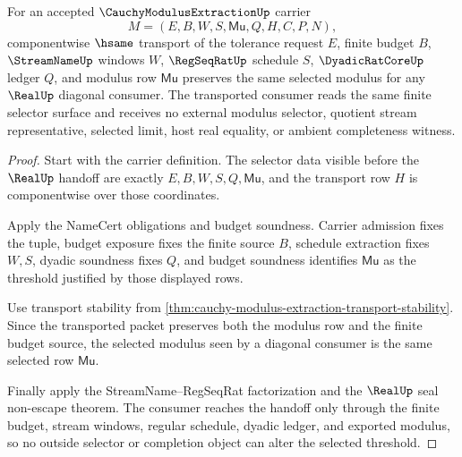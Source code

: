 \begin{theorem}
\label{thm:cauchy-modulus-extraction-selector-stability}
For an accepted $\CauchyModulusExtractionUp$ carrier
$$
M=(E,B,W,S,\mathsf{Mu},Q,H,C,P,N),
$$
componentwise $\hsame$ transport of the tolerance request $E$, finite budget $B$, $\StreamNameUp$ windows $W$, $\RegSeqRatUp$ schedule $S$, $\DyadicRatCoreUp$ ledger $Q$, and modulus row $\mathsf{Mu}$ preserves the same selected modulus for any $\RealUp$ diagonal consumer. The transported consumer reads the same finite selector surface and receives no external modulus selector, quotient stream representative, selected limit, host real equality, or ambient completeness witness.
\end{theorem}
\begin{proof}
Start with the carrier definition. The selector data visible before the $\RealUp$ handoff are exactly $E,B,W,S,Q,\mathsf{Mu}$, and the transport row $H$ is componentwise over those coordinates.

Apply the NameCert obligations and budget soundness. Carrier admission fixes the tuple, budget exposure fixes the finite source $B$, schedule extraction fixes $W,S$, dyadic soundness fixes $Q$, and budget soundness identifies $\mathsf{Mu}$ as the threshold justified by those displayed rows.

Use transport stability from \autoref{thm:cauchy-modulus-extraction-transport-stability}. Since the transported packet preserves both the modulus row and the finite budget source, the selected modulus seen by a diagonal consumer is the same selected row $\mathsf{Mu}$.

Finally apply the StreamName--RegSeqRat factorization and the $\RealUp$ seal non-escape theorem. The consumer reaches the handoff only through the finite budget, stream windows, regular schedule, dyadic ledger, and exported modulus, so no outside selector or completion object can alter the selected threshold.
\end{proof}

